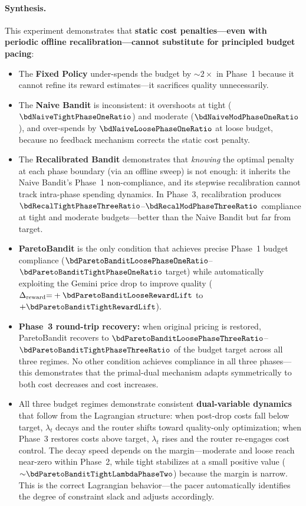 \paragraph{Synthesis.}
This experiment demonstrates that
\textbf{static cost penalties---even with periodic offline
recalibration---cannot substitute for principled budget pacing}:
\begin{itemize}[nosep,leftmargin=*]
  \item The \textbf{Fixed Policy} under-spends the budget by
    ${\sim}2\times$ in Phase~1 because it cannot refine its reward
    estimates---it sacrifices quality unnecessarily.
  \item The \textbf{Naive Bandit} is inconsistent: it overshoots
    at tight ($\bdNaiveTightPhaseOneRatio$) and moderate
    ($\bdNaiveModPhaseOneRatio$), and over-spends by
    $\bdNaiveLoosePhaseOneRatio$ at loose budget, because no
    feedback mechanism corrects the static cost penalty.
  \item The \textbf{Recalibrated Bandit} demonstrates that
    \emph{knowing} the optimal penalty at each phase boundary
    (via an offline sweep) is not enough: it inherits the Naive
    Bandit's Phase~1 non-compliance, and its stepwise recalibration
    cannot track intra-phase spending dynamics.
    In Phase~3, recalibration produces
    $\bdRecalTightPhaseThreeRatio$--$\bdRecalModPhaseThreeRatio$
    compliance at tight and moderate budgets---better than the Naive
    Bandit but far from target.
  \item \textbf{ParetoBandit} is the only condition that achieves
    precise Phase~1 budget compliance
    ($\bdParetoBanditLoosePhaseOneRatio$--$\bdParetoBanditTightPhaseOneRatio$ target)
    while automatically exploiting the Gemini price
    drop to improve quality
    ($\Delta_\mathrm{reward}{=}+\bdParetoBanditLooseRewardLift$ to
    $+\bdParetoBanditTightRewardLift$).
  \item \textbf{Phase~3 round-trip recovery:} when original pricing
    is restored, ParetoBandit recovers to
    $\bdParetoBanditLoosePhaseThreeRatio$--$\bdParetoBanditTightPhaseThreeRatio$
    of the budget target across all three regimes.  No other
    condition achieves compliance in all three phases---this
    demonstrates that the primal-dual mechanism adapts symmetrically
    to both cost decreases and cost increases.
  \item All three budget regimes demonstrate consistent
    \textbf{dual-variable dynamics} that follow from the Lagrangian
    structure: when post-drop costs fall below target, $\lambda_t$
    decays and the router shifts toward quality-only optimization;
    when Phase~3 restores costs above target, $\lambda_t$ rises
    and the router re-engages cost control.
    The decay speed depends on the margin---moderate and loose
    reach near-zero within Phase~2, while tight stabilizes at a
    small positive value
    (${\sim}\bdParetoBanditTightLambdaPhaseTwo$) because the margin
    is narrow.
    This is the correct Lagrangian behavior---the pacer
    automatically identifies the degree of constraint slack
    and adjusts accordingly.
\end{itemize}
